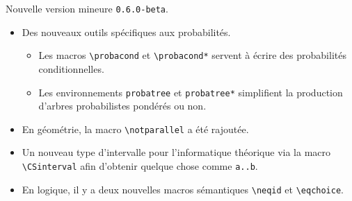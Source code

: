 Nouvelle version mineure \verb+0.6.0-beta+.

\begin{itemize}[itemsep=.5em]
    \item Des nouveaux outils spécifiques aux probabilités.
    \begin{itemize}[itemsep=.5em]
        \item Les macros \verb+\probacond+ et \verb+\probacond*+ servent à écrire des probabilités conditionnelles.

        \item Les environnements \verb+probatree+ et \verb+probatree*+ simplifient la production d'arbres probabilistes pondérés ou non.
    \end{itemize}


    \item En géométrie, la macro \verb+\notparallel+ a été rajoutée.


    \item Un nouveau type d'intervalle pour l'informatique théorique via la macro \verb+\CSinterval+ afin d'obtenir quelque chose comme \verb+a..b+.


    \item En logique, il y a deux nouvelles macros sémantiques \verb+\neqid+ et \verb+\eqchoice+.
\end{itemize}
